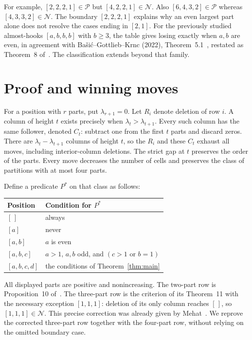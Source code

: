 \documentclass[11pt]{article}
\newcommand{\PP}{\mathcal P}
\newcommand{\NN}{\mathcal N}
\begin{document}
For example, $[2,2,2,1]\in\PP$ but $[4,2,2,1]\in\NN$.
Also $[6,4,3,2]\in\PP$ whereas $[4,3,3,2]\in\NN$.
The boundary $[2,2,2,1]$ explains why an even largest part alone does not
resolve the cases ending in $[2,1]$.
For the previously studied almost-hooks $[a,b,b,b]$ with $b\ge3$,
the table gives losing exactly when $a,b$ are even, in agreement with
Ba\v{s}i\'c--Gottlieb--Krnc (2022), Theorem~5.1~\cite{BGK22}, restated
as Theorem~8 of~\cite{BGK}. The classification extends beyond that family.

\section{Proof and winning moves}
For a position with $r$ parts, put $\lambda_{r+1}=0$.
Let $R_i$ denote deletion of row $i$.
A column of height $t$ exists precisely when $\lambda_t>\lambda_{t+1}$.
Every such column has the same follower, denoted $C_t$: subtract one from
the first $t$ parts and discard zeros.
There are $\lambda_t-\lambda_{t+1}$ columns of height $t$, so the
$R_i$ and these $C_t$ exhaust all moves, including interior-column deletions.
The strict gap at $t$ preserves the order of the parts.
Every move decreases the number of cells and preserves the class of
partitions with at most four parts.

Define a predicate $P^*$ on that class as follows:
\begin{center}
\begin{tabular}{ll}
\toprule
Position & Condition for $P^*$\\
\midrule
$[\,]$ & always\\
$[a]$ & never\\
$[a,b]$ & $a$ is even\\
$[a,b,c]$ & $a>1$, $a,b$ odd, and $(c>1\text{ or }b=1)$\\
$[a,b,c,d]$ & the conditions of Theorem~\ref{thm:main}\\
\bottomrule
\end{tabular}
\end{center}
All displayed parts are positive and nonincreasing.
The two-part row is Proposition~10 of~\cite{BGK}.
The three-part row is the criterion of its Theorem~11 with the necessary
exception $[1,1,1]$: deletion of its only column reaches $[\,]$, so
$[1,1,1]\in\NN$. This precise correction was already given by
Mehat~\cite[Corollary~25, p.~9; Section~12, p.~12]{Mehat}.
We reprove the corrected three-part row together with
the four-part row, without relying on the omitted boundary case.
\end{document}
